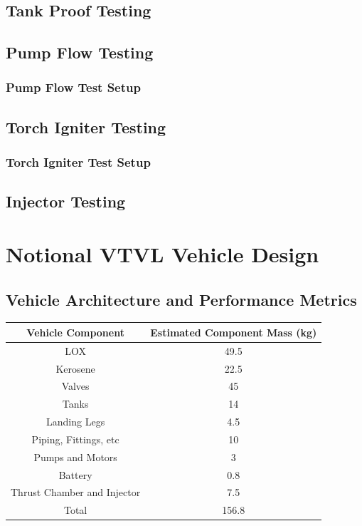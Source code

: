 \documentclass[12pt, letterpaper]{article}
\begin{document}
\subsection{Tank Proof Testing}
\subsection{Pump Flow Testing}
\subsubsection{Pump Flow Test Setup}
\subsection{Torch Igniter Testing}
\subsubsection{Torch Igniter Test Setup}
\subsection{Injector Testing}

\newpage

\section{Notional VTVL Vehicle Design}
\subsection{Vehicle Architecture and Performance Metrics}

\begin{tabular}{|c|c|}

\hline

Vehicle Component & Estimated Component Mass (kg) \\

\hline

LOX & 49.5 \\
Kerosene & 22.5 \\
Valves & 45 \\
Tanks & 14 \\
Landing Legs & 4.5 \\
Piping, Fittings, etc & 10 \\
Pumps and Motors & 3 \\
Battery & 0.8 \\
Thrust Chamber and Injector & 7.5 \\

\hline

Total & 156.8 \\

\hline

\end{tabular}
\end{document}
